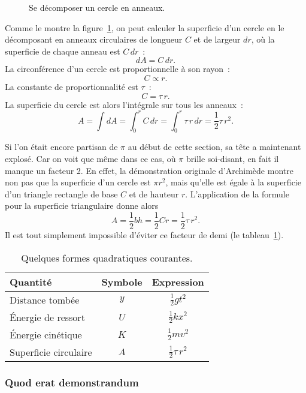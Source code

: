 \begin{figure}
\begin{center}
\end{center}
\caption{Se décomposer un cercle en anneaux.\label{fig:circular_area}}
\end{figure}


Comme le montre la figure~\ref{fig:circular_area}, on peut calculer la
superficie d'un cercle en le décomposant en anneaux circulaires de longueur $C$
et de largeur $dr$, où la superficie de chaque anneau est $C\,dr$~:
\[ dA = C\,dr. \]
La circonférence d'un cercle est proportionnelle à son rayon~:
\[ C \propto r. \]
La constante de proportionnalité est $\tau$~:
\[ C = \tau\,r. \]
La superficie du cercle est alors l'intégrale sur tous les anneaux~:
\[ A = \int dA = \int_0^r C\,dr = \int_0^r \tau\,r\,dr = \textstyle{\frac{1}{2}} \tau\,r^2. \]

Si l'on était encore partisan de $\pi$ au début de cette section, sa tête a
maintenant explosé. Car on voit que même dans ce cas, où $\pi$ brille
soi-disant, en fait il manque un facteur 2. En effet, la démonstration originale
d'Archimède montre non pas que la superficie d'un cercle est $\pi r^2$, mais
qu'elle est égale à la superficie d'un triangle rectangle de base $C$ et de
hauteur $r$. L'application de la formule pour la superficie triangulaire donne
alors
\[
  A = \textstyle{\frac{1}{2}} bh = \textstyle{\frac{1}{2}}Cr = \textstyle{\frac{1}{2}}\tau\,r^2.
\]
Il est tout simplement impossible d'éviter ce facteur de demi (le
tableau~\ref{table:quadratic_forms}).

\begin{table}
\begin{center}
\begin{tabular}{lcc}
Quantité & Symbole & Expression \\ \hline
Distance tombée & $y$ & $\textstyle{\frac{1}{2}}gt^2$ \smallskip \\
Énergie de ressort & $U$ & $\textstyle{\frac{1}{2}}kx^2$ \smallskip \\
Énergie cinétique & $K$ & $\textstyle{\frac{1}{2}}mv^2$ \smallskip \\
Superficie circulaire & $A$ & $\textstyle{\frac{1}{2}}\tau\,r^2$
\end{tabular}
\end{center}
\caption{Quelques formes quadratiques courantes.\label{table:quadratic_forms}}
\end{table}

    \subsubsection{Quod erat demonstrandum} %
    \label{sec:quod_erat_demonstrandum}

